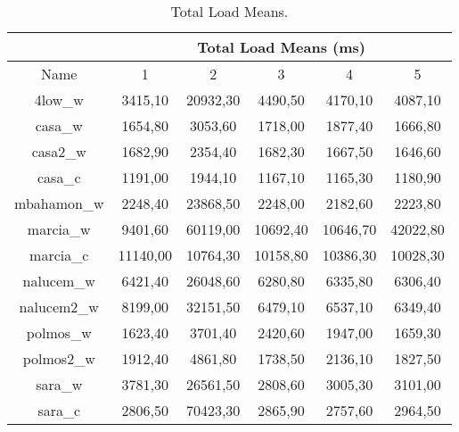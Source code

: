 
\begin{table}[ht]
\begin{center}
\begin{tabular}{|c||c|c|c|c|c||}
 \hline
& \multicolumn{5}{|c|}{ Total Load Means (ms)} \\ \hline
Name         & 1		& 2			& 3			& 4			& 5 		\\ \hline \hline	
4low\_w		 & 3415,10	& 20932,30	& 4490,50	& 4170,10	& 4087,10 	\\ \hline	
casa\_w		 & 1654,80	& 3053,60	& 1718,00	& 1877,40	& 1666,80 	\\ \hline
casa2\_w		 & 1682,90	& 2354,40	& 1682,30	& 1667,50	& 1646,60 	\\ \hline	
casa\_c		 & 1191,00	& 1944,10	& 1167,10	& 1165,30	& 1180,90 	\\ \hline	
mbahamon\_w	 & 2248,40	& 23868,50	& 2248,00	& 2182,60	& 2223,80 	\\ \hline	
marcia\_w	 & 9401,60	& 60119,00	& 10692,40	& 10646,70	& 42022,80 	\\ \hline	
marcia\_c	 & 11140,00	& 10764,30	& 10158,80	& 10386,30	& 10028,30 	\\ \hline	
nalucem\_w	 & 6421,40	& 26048,60	& 6280,80	& 6335,80	& 6306,40 	\\ \hline	
nalucem2\_w	 & 8199,00	& 32151,50	& 6479,10	& 6537,10	& 6349,40 	\\ \hline	
polmos\_w	 & 1623,40	& 3701,40	& 2420,60	& 1947,00	& 1659,30 	\\ \hline	
polmos2\_w	 & 1912,40	& 4861,80	& 1738,50	& 2136,10	& 1827,50 	\\ \hline	
sara\_w		 & 3781,30	& 26561,50	& 2808,60	& 3005,30	& 3101,00 	\\ \hline	
sara\_c		 & 2806,50	& 70423,30	& 2865,90	& 2757,60	& 2964,50 	\\ \hline	
\end{tabular}
\caption[Page Benchmark: Total Load Means.]{Total Load Means.}
\label{table:loadmeans}
\end{center}
\end{table}